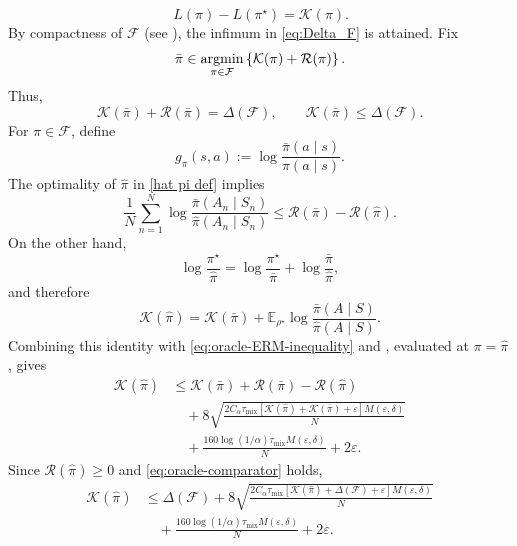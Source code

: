 \documentclass{article}
\theoremstyle{definition}
\theoremstyle{remark}
\theoremstyle{plain}
\def\argmin{\operatornamewithlimits{argmin}}
\newcommand{\E}{\mathbb{E}}
\numberwithin{equation}{section}
\begin{document}
\[
    \,L(\pi)-L(\pi^\star)
    =
    \mathcal K(\pi).
\]
By compactness of \(\mathcal F\) (see ), the infimum in
\eqref{eq:Delta_F} is attained. Fix
\[
    \bar\pi
    \in
    \argmin_{\pi\in\mathcal F}
    \left\{
        \mathcal K(\pi)+\mathcal R(\pi)
    \right\}.
\]
Thus,
\begin{equation}
\label{eq:oracle-comparator}
    \mathcal K(\bar\pi)+\mathcal R(\bar\pi)
    =
    \Delta(\mathcal F),
    \qquad
    \mathcal K(\bar\pi)
    \leq
    \Delta(\mathcal F).
\end{equation}
For \(\pi\in\mathcal F\), define
\[
    g_\pi(s,a)
    :=
    \log\frac{\bar\pi(a\mid s)}{\pi(a\mid s)}.
\]
The optimality of \(\widehat\pi\) in \eqref{hat pi def} implies
\begin{equation}
\label{eq:oracle-ERM-inequality}
    \frac1N
    \sum_{n=1}^N
    \log
    \frac{
        \bar\pi(A_n\mid S_n)
    }{
        \widehat\pi(A_n\mid S_n)
    }
    \leq
    \mathcal R(\bar\pi)-\mathcal R(\widehat\pi).
\end{equation}
On the other hand,
\[
    \log\frac{\pi^\star}{\widehat\pi}
    =
    \log\frac{\pi^\star}{\bar\pi}
    +
    \log\frac{\bar\pi}{\widehat\pi},
\]
and therefore
\[
   \mathcal K(\widehat\pi)
    =
    \mathcal K(\bar\pi)
    +
    \E_{\rho^\star}
    \log
    \frac{
        \bar\pi(A\mid S)
    }{
        \widehat\pi(A\mid S)
    }.
\]
Combining this identity with
\eqref{eq:oracle-ERM-inequality} and
, evaluated at
\(\pi=\widehat\pi\), gives
\begin{align}
\label{eq:oracle-self-bound-general}
    \mathcal K(\widehat\pi)
    &\leq
    \mathcal K(\bar\pi)
    +
    \mathcal R(\bar\pi)
    -
    \mathcal R(\widehat\pi)
    \nonumber\\
    &\quad+
    8
    \sqrt{
        \frac{
            2C_\alpha\tau_{\mathrm{mix}}
            \left[
                \mathcal K(\widehat\pi)
                +
                \mathcal K(\bar\pi)
                +
                \varepsilon
            \right]
            M(\varepsilon,\delta)
        }{N}
    }
    \nonumber\\
    &\quad+
    \frac{
        160\log(1/\alpha)\tau_{\mathrm{mix}}
        M(\varepsilon,\delta)
    }{N}
    +
    2\varepsilon.
\end{align}
Since \(\mathcal R(\widehat\pi)\geq0\) and
\eqref{eq:oracle-comparator} holds,
\begin{align}
\label{eq:oracle-self-bound}
    \mathcal K(\widehat\pi)
    &\leq
    \Delta(\mathcal F)
    +
    8
    \sqrt{
        \frac{
            2C_\alpha\tau_{\mathrm{mix}}
            \left[
                \mathcal K(\widehat\pi)
                +
                \Delta(\mathcal F)
                +
                \varepsilon
            \right]
            M(\varepsilon,\delta)
        }{N}
    }
    \nonumber\\
    &\quad+
    \frac{
        160\log(1/\alpha)\tau_{\mathrm{mix}}
        M(\varepsilon,\delta)
    }{N}
    +
    2\varepsilon.
\end{align}
\end{document}
